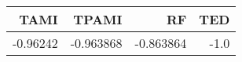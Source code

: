 \begin{tabular}{rrrr}
\toprule
    TAMI &     TPAMI &        RF &  TED \\
\midrule
-0.96242 & -0.963868 & -0.863864 & -1.0 \\
\bottomrule
\end{tabular}
